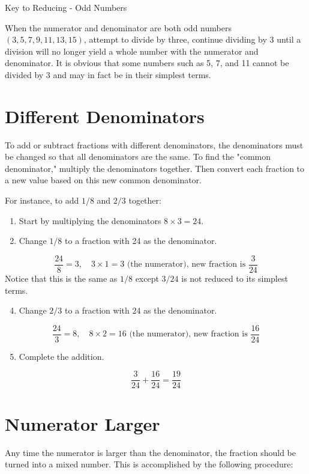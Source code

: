\documentclass[10pt]{article}
\begin{document}
Key to Reducing - Odd Numbers

When the numerator and denominator are both odd numbers $(3,5,7,9,11,13,15)$, attempt to divide by three, continue dividing by 3 until a division will no longer yield a whole number with the numerator and denominator. It is obvious that some numbers such as 5, 7, and 11 cannot be divided by 3 and may in fact be in their simplest terms.

\section{Different Denominators}
To add or subtract fractions with different denominators, the denominators must be changed so that all denominators are the same. To find the "common denominator," multiply the denominators together. Then convert each fraction to a new value based on this new common denominator.

For instance, to add $1 / 8$ and $2 / 3$ together:

\begin{enumerate}
  \item Start by multiplying the denominators $8 \times 3=24$.

  \item Change $1 / 8$ to a fraction with 24 as the denominator.

\end{enumerate}
$$
\frac{24}{8}=3, \quad 3 \times 1=3 \text { (the numerator), new fraction is } \frac{3}{24}
$$
Notice that this is the same as $1 / 8$ except $3 / 24$ is not reduced to its simplest terms.

\begin{enumerate}
  \setcounter{enumi}{3}
  \item Change $2 / 3$ to a fraction with 24 as the denominator.
\end{enumerate}
$$
\frac{24}{3}=8, \quad 8 \times 2=16 \text { (the numerator), new fraction is } \frac{16}{24}
$$

\begin{enumerate}
  \setcounter{enumi}{4}
  \item Complete the addition.
\end{enumerate}
$$
\frac{3}{24}+\frac{16}{24}=\frac{19}{24}
$$

\section{Numerator Larger}
Any time the numerator is larger than the denominator, the fraction should be turned into a mixed number. This is accomplished by the following procedure:
\end{document}
